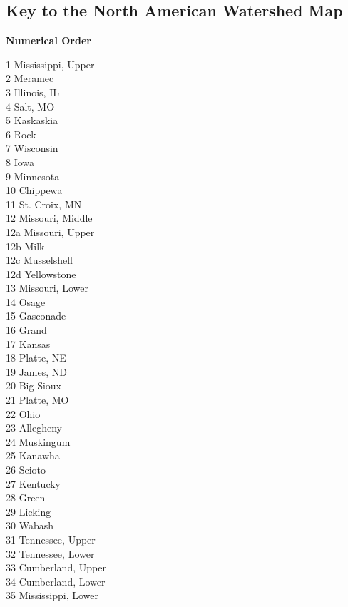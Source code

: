 \documentclass[11pt]{article}
\begin{document}
\thispagestyle{empty}
\begin{center}
	\section*{Key to the North American Watershed Map}
	\textbf{Numerical Order}
\end{center}

\begin{multicols}{3}
1 Mississippi, Upper\\
2 Meramec\\
3 Illinois, IL\\
4 Salt, MO\\
5 Kaskaskia\\
6 Rock\\
7 Wisconsin\\
8 Iowa\\
9 Minnesota\\
10 Chippewa\\
11 St. Croix, MN\\
12 Missouri, Middle\\
12a Missouri, Upper\\
12b Milk\\
12c Musselshell\\
12d Yellowstone\\
13 Missouri, Lower\\
14 Osage\\
15 Gasconade\\
16 Grand\\
17 Kansas\\
18 Platte, NE\\
19 James, ND\\
20 Big Sioux\\
21 Platte, MO\\
22 Ohio\\
23 Allegheny\\
24 Muskingum\\
25 Kanawha\\
26 Scioto\\
27 Kentucky\\
28 Green\\
29 Licking\\
30 Wabash\\
31 Tennessee, Upper\\
32 Tennessee, Lower\\
33 Cumberland, Upper\\
34 Cumberland, Lower\\
35 Mississippi, Lower\\

\end{multicols}
\end{document}
